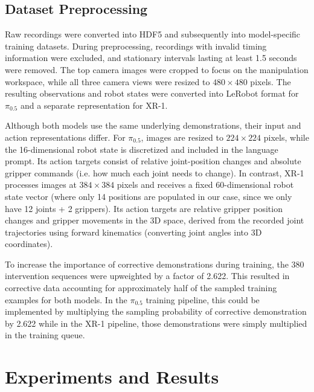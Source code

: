 \documentclass[10pt,twocolumn,letterpaper]{article}
\begin{document}
\subsection{Dataset Preprocessing}

Raw recordings were converted into HDF5 and subsequently into model-specific training datasets. During preprocessing, recordings with invalid timing information were excluded, and stationary intervals lasting at least 1.5 seconds were removed. The top camera images were cropped to focus on the manipulation workspace, while all three camera views were resized to $480 \times 480$ pixels. The resulting observations and robot states were converted into LeRobot format for $\pi_{0.5}$ and a separate representation for XR-1.

Although both models use the same underlying demonstrations, their input and action representations differ. For $\pi_{0.5}$, images are resized to $224 \times 224$ pixels, while the 16-dimensional robot state is discretized and included in the language prompt. Its action targets consist of relative joint-position changes and absolute gripper commands (i.e. how much each joint needs to change). In contrast, XR-1 processes images at $384 \times 384$ pixels and receives a fixed 60-dimensional robot state vector (where only 14 positions are populated in our case, since we only have 12 joints + 2 grippers). Its action targets are relative gripper position changes and gripper movements in the 3D space, derived from the recorded joint trajectories using forward kinematics (converting joint angles into 3D coordinates).

To increase the importance of corrective demonstrations during training, the 380 intervention sequences were upweighted by a factor of 2.622. This resulted in corrective data accounting for approximately half of the sampled training examples for both models. In the $\pi_{0.5}$ training pipeline, this could be implemented by multiplying the sampling probability of corrective demonstration by 2.622 while in the XR-1 pipeline, those demonstrations were simply multiplied in the training queue.  

\section{Experiments and Results}
\end{document}
